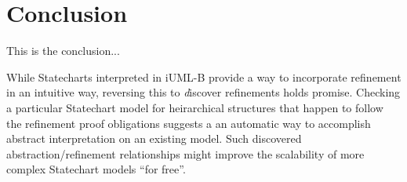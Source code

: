 
\section{Conclusion}
\label{sec:conclusion}
This is the conclusion...


While Statecharts interpreted in iUML-B provide a way to incorporate
refinement in an intuitive way, reversing this to {\emph discover}
refinements holds promise.  Checking a particular Statechart model for
heirarchical structures that happen to follow the refinement proof
obligations suggests a an automatic way to accomplish abstract
interpretation on an existing model.  Such discovered
abstraction/refinement relationships might improve the scalability of
more complex Statechart models ``for free''.
